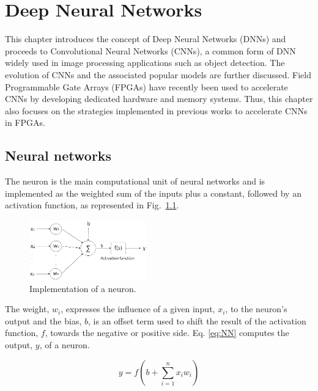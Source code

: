 \chapter{Deep Neural Networks}
\label{chapter:DNN}

This chapter introduces the concept of Deep Neural Networks (DNNs) and proceeds to Convolutional Neural Networks (CNNs), a common form of DNN widely used in image processing applications such as object detection. The evolution of CNNs and the associated popular models are further discussed. Field Programmable Gate Arrays (FPGAs) have recently been used to accelerate CNNs by developing dedicated hardware and memory systems. Thus, this chapter also focuses on the strategies implemented in previous works to accelerate CNNs in FPGAs.

\section{Neural networks}
\label{section:NNs}

The neuron is the main computational unit of neural networks and is implemented as the weighted sum of the inputs plus a constant, followed by an activation function, as represented in Fig.~\ref{fig:neuron}.

\begin{figure}[!htb]
  \centering
  \includegraphics[width=0.45\textwidth]{Figures/neuron.png}
  \caption{Implementation of a neuron.}
  \label{fig:neuron}
\end{figure}

The weight, $w_{i}$, expresses the influence of a given input, $x_{i}$, to the neuron's output and the bias, $b$, is an offset term used to shift the result of the activation function, $f$, towards the negative or positive side. Eq. \ref{eq:NN} computes the output, $y$, of a neuron.

\begin{equation}
  y = f \left( b + \sum_{i=1}^{n} x_{i} w_{i} \right)
\label{eq:NN}
\end{equation}

